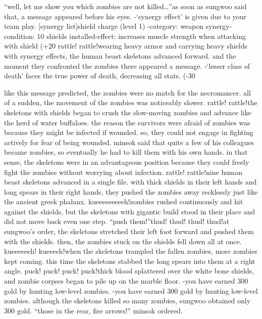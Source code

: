 “well, let me show you which zombies are not killed…”as soon as sungwoo said that, a message appeared before his eyes.
-‘synergy effect’ is given due to your team play.
[synergy list]shield charge (level 1) -category: weapon synergy-condition: 10 shields installed-effect: increases muscle strength when attacking with shield (+20%
rattle! rattle!wearing heavy armor and carrying heavy shields with synergy effects, the human beast skeletons advanced forward.
 and the moment they confronted the zombies there appeared a message.
-‘lesser class of death’ faces the true power of death, decreasing all stats.
 (-30%

like this message predicted, the zombies were no match for the necromancer.
all of a sudden, the movement of the zombies was noticeably slower.
rattle! rattle!the skeletons with shields began to crush the slow-moving zombies and advance like the herd of water buffaloes.
the reason the survivors were afraid of zombies was because they might be infected if wounded.
 so, they could not engage in fighting actively for fear of being wounded.
minsok said that quite a few of his colleagues became zombies, so eventually he had to kill them with his own hands.
in that sense, the skeletons were in an advantageous position because they could freely fight the zombies without worrying about infection.
rattle! rattle!nine human beast skeletons advanced in a single file.
 with thick shields in their left hands and long spears in their right hands, they pushed the zombies away recklessly just like the ancient greek phalanx.
kueeeeeeeeeh!zombies rushed continuously and hit against the shields, but the skeletons with gigantic build stood in their place and did not move back even one step.
“push them!”thud! thud! thud! thud!at sungwoo’s order, the skeletons stretched their left foot forward and pushed them with the shields.
 then, the zombies stuck on the shields fell down all at once.
kueeeeeeh! kueeeeh!when the skeletons trampled the fallen zombies, more zombies kept coming.
 this time the skeletons stabbed the long spears into them at a right angle.
puck! puck! puck! puck!thick blood splattered over the white bone shields, and zombie corpses began to pile up on the marble floor.
-you have earned 300 gold by hunting low-level zombies.
-you have earned 300 gold by hunting low-level zombies.
although the skeletons killed so many zombies, sungwoo obtained only 300 gold.
“those in the rear, fire arrows!” minsok ordered.


 